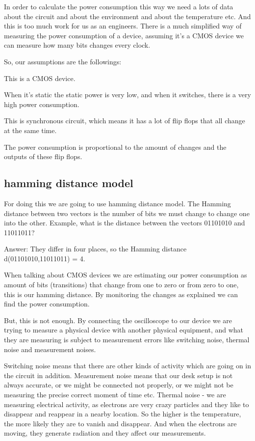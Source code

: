 In order to calculate the power consumption this way we need a lots of data
about the circuit and about the environment and about the temperature etc. And
this is too much work for us as an engineers. There is a much simplified way of
measuring the power consumption of a device, assuming it's a CMOS device we can
measure how many bits changes every clock.

So, our assumptions are the followings:
\begin{inparaenum}
    \item This is a CMOS device.
    \item When it's static the static power is very low, and when it switches,
    there is a very high power consumption.
    \item This is synchronous circuit, which means it has a lot of flip flops
    that all change at the same time.
    \item The power consumption is proportional to the amount of changes and the
    outputs of these flip flops.
\end{inparaenum}


\subsection { hamming distance model }

For doing this we are going to use hamming distance model. The Hamming distance
between two vectors is the number of bits we must change to change one into the
other. Example, what is the distance between the vectors 01101010 and 11011011? 

Answer: They differ in four places, so the Hamming distance d(01101010,11011011)
= 4.

When talking about CMOS devices we are estimating our power consumption as
amount of bits (transitions) that change from one to zero or from zero to one,
this is our hamming distance. By monitoring the changes as explained we can find
the power consumption.

But, this is not enough. By connecting the oscilloscope to our device we are
trying to measure a physical device with another physical equipment, and what
they are measuring is subject to measurement errors like switching noise,
thermal noise and measurement noises.

Switching noise means that there are other kinds of activity which are going on
in the circuit in addition. Measurement noise means that our desk setup is not
always accurate, or we might be connected not properly, or we might not be
measuring the precise correct moment of time etc. Thermal noise - we are
measuring electrical activity, as electrons are very crazy particles and they
like to disappear and reappear in a nearby location. So the higher is the
temperature, the more likely they are to vanish and disappear. And when the
electrons are moving, they generate radiation and they affect our measurements.

